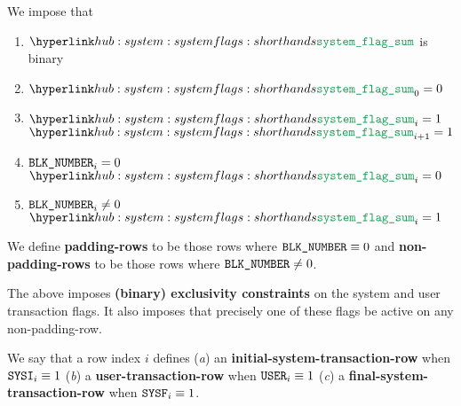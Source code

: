 We impose that
\begin{enumerate}
	\item $\flagSum$ is binary
	\item $\flagSum _{0} = 0$
	\item \If $\flagSum _{i} = 1$ \Then $\flagSum _{i + 1} = 1$
	\item \If $\texttt{BLK\_NUMBER} _{i} =    0$ \Then $\flagSum _{i} = 0$
	\item \If $\texttt{BLK\_NUMBER} _{i} \neq 0$ \Then $\flagSum _{i} = 1$
\end{enumerate}
\saNote{} \label{hub: system: padding row definition}
We define \textbf{padding-rows} to be those rows where $\texttt{BLK\_NUMBER} \equiv 0$ and
\textbf{non-padding-rows} to be those rows where $\texttt{BLK\_NUMBER} \neq 0$.

\saNote{} \label{hub: system: exclusivity of the system and user transaction flags}
The above imposes \textbf{(binary) exclusivity constraints} on the system and user transaction flags.
It also imposes that precisely one of these flags be active on any non-padding-row.

\saNote{} \label{hub: system: flags: user and system transaction rows}
We say that a row index $i$ defines
(\emph{a}) an \textbf{initial-system-transaction-row} when $\texttt{SYSI} _{i} \equiv 1$
(\emph{b}) a  \textbf{user-transaction-row}           when $\texttt{USER} _{i} \equiv 1$
(\emph{c}) a  \textbf{final-system-transaction-row}   when $\texttt{SYSF} _{i} \equiv 1$.
